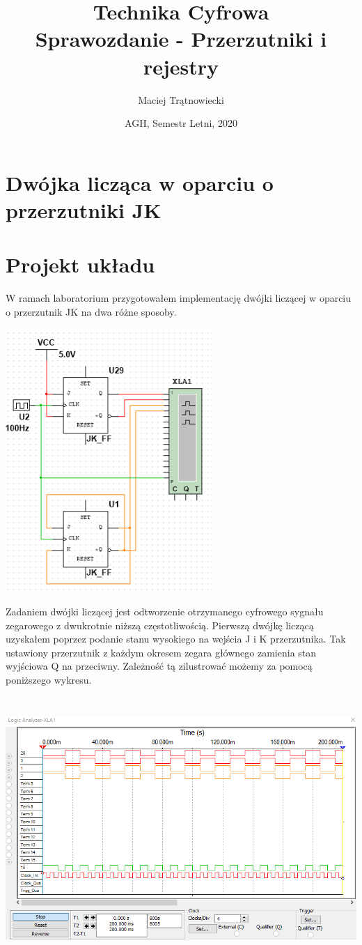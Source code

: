 \documentclass{article}
\title{Technika Cyfrowa\\
Sprawozdanie - Przerzutniki i rejestry}
\author{Maciej Trątnowiecki}
\date{AGH, Semestr Letni, 2020}
\begin{document}
    \maketitle
    \section{Dwójka licząca w oparciu o przerzutniki JK}
        \section{Projekt układu}
            W ramach laboratorium przygotowałem implementację dwójki liczącej w oparciu o przerzutnik JK na dwa różne sposoby. 
            \begin{center}
                \includegraphics[height=10cm]{reports/img/Z3A_1.png}\\
            \end{center}
            Zadaniem dwójki liczącej jest odtworzenie otrzymanego cyfrowego sygnału zegarowego z dwukrotnie niższą częstotliwością. Pierwszą dwójkę liczącą uzyskałem poprzez podanie stanu wysokiego na wejścia J i K przerzutnika. Tak ustawiony przerzutnik z każdym okresem zegara głównego zamienia stan wyjściowa Q na przeciwny. Zależność tą zilustrować możemy za pomocą poniższego wykresu. 
            
            
            \begin{center}
                \includegraphics[height=10cm]{reports/img/Z3A_2.png}\\
            \end{center}
            
\end{document}
